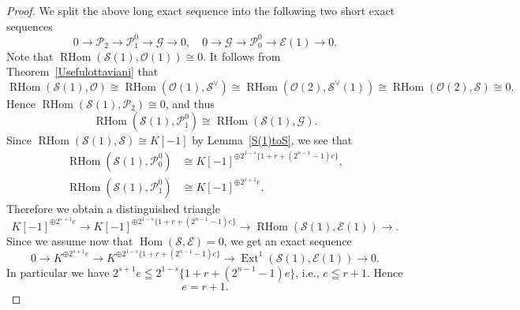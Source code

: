 \documentclass[a4paper,12pt]{amsart}
\DeclareMathOperator{\Hom}{Hom}
\DeclareMathOperator{\Ext}{Ext}
\DeclareMathOperator{\RHom}{RHom}
\begin{document}
\begin{proof}
We split the above long exact sequence into the following two short exact sequences
\begin{equation*}
0
\to \mathcal{P}_2
\to \mathcal{P}^{0}_1
\to \mathcal{G}
\to 0,\quad
0
\to \mathcal{G}
\to \mathcal{P}^{0}_0
\to \mathcal{E}(1)\to 0.
\end{equation*}
Note that $\RHom(\mathcal{S}(1),\mathcal{O}(1))\cong 0$.
It follows from Theorem~\ref{Usefulottaviani} that 
\[\RHom(\mathcal{S}(1),\mathcal{O})\cong \RHom(\mathcal{O}(1),\mathcal{S}^{\vee})
\cong \RHom(\mathcal{O}(2),\mathcal{S}^{\vee}(1))\cong \RHom(\mathcal{O}(2),\mathcal{S})\cong 0.\]
Hence 
$\RHom(\mathcal{S}(1),\mathcal{P}_2)\cong 0$,
 and thus 
\[
\RHom(\mathcal{S}(1),\mathcal{P}^0_1)\cong \RHom(\mathcal{S}(1),\mathcal{G}).
\]
Since $\RHom(\mathcal{S}(1),\mathcal{S})\cong K[-1]$ by Lemma~\ref{S(1)toS},
we see that 
\begin{equation*}
\begin{split}
\RHom(\mathcal{S}(1),\mathcal{P}^{0}_0)
&
\cong K[-1]^{\oplus 2^{1-s}\{1+r+(2^{n-1}-1)e\}},
\\
\RHom(\mathcal{S}(1),\mathcal{P}^{0}_1)
&
\cong K[-1]^{\oplus 2^{s+1}e}.
\end{split}
\end{equation*}
Therefore we obtain a distinguished triangle
\[
K[-1]^{\oplus 2^{s+1}e}
\to
K[-1]^{\oplus 2^{1-s}\{1+r+(2^{n-1}-1)e\}}
\to
\RHom(\mathcal{S}(1),\mathcal{E}(1))
\to.
\]
Since we assume now that $\Hom (\mathcal{S},\mathcal{E})=0$,
we get an exact sequence
\[
0
\to 
K^{\oplus 2^{s+1}e}
\to
K^{\oplus 2^{1-s}\{1+r+(2^{n-1}-1)e\}}
\to
\Ext^1(\mathcal{S}(1),\mathcal{E}(1))
\to
0.
\]
In particular we have $2^{s+1}e\leqq 2^{1-s}\{1+r+(2^{n-1}-1)e\}$, i.e., $e\leqq r+1$.
Hence 
\[e=r+1.
\]


\end{proof}
\end{document}
